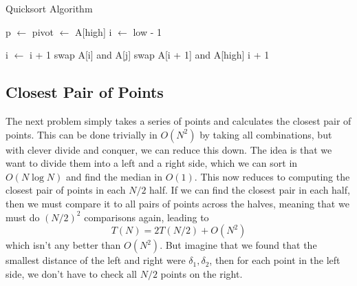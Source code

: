   \begin{algo}
    
    \begin{algorithm}[H]
      \caption{Quicksort Algorithm}
      \label{alg:quicksort}
      \begin{algorithmic}
        \State
                \State p $\gets$  
                \State {} 
                \State {} 
            \EndIf
        \EndFunction
        \State
            \State pivot $\gets$ A[high] 
            \State i $\gets$ low - 1 
            
             
                    \State i $\gets$ i + 1 
                    \State swap A[i] and A[j] 
                \EndIf
            \EndFor
            \State swap A[i + 1] and A[high] 
            \Return i + 1 
        \EndFunction
      \end{algorithmic}
    \end{algorithm}
  \end{algo}

\subsection{Closest Pair of Points} 

  The next problem simply takes a series of points and calculates the closest pair of points. This can be done trivially in $O(N^2)$ by taking all combinations, but with clever divide and conquer, we can reduce this down. The idea is that we want to divide them into a left and a right side, which we can sort in $O(N \log{N})$ and find the median in $O(1)$. This now reduces to computing the closest pair of points in each $N/2$ half. If we can find the closest pair in each half, then we must compare it to all pairs of points across the halves, meaning that we must do $(N/2)^2$ comparisons again, leading to 
  \begin{equation}
    T(N) = 2 T(N/2) + O(N^2)
  \end{equation}
  which isn't any better than $O(N^2)$. But imagine that we found that the smallest distance of the left and right were $\delta_1, \delta_2$, then for each point in the left side, we don't have to check all $N/2$ points on the right. 

